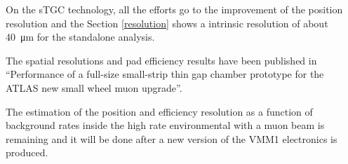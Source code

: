 On the sTGC technology, all the efforts go to the improvement of the position resolution and the Section
\ref{resolution} shows a intrinsic resolution of about \SI{40}{\micro m} for the standalone analysis.\par

The spatial resolutions and pad efficiency results have been published in ``Performance of a full-size small-strip thin gap chamber prototype
for the ATLAS new small wheel muon upgrade''\cite{performance}.

The estimation of the position and efficiency resolution as a function of background rates inside the high rate
environmental with a muon beam is remaining and it will be done after a new version of the VMM1 electronics is produced.  

